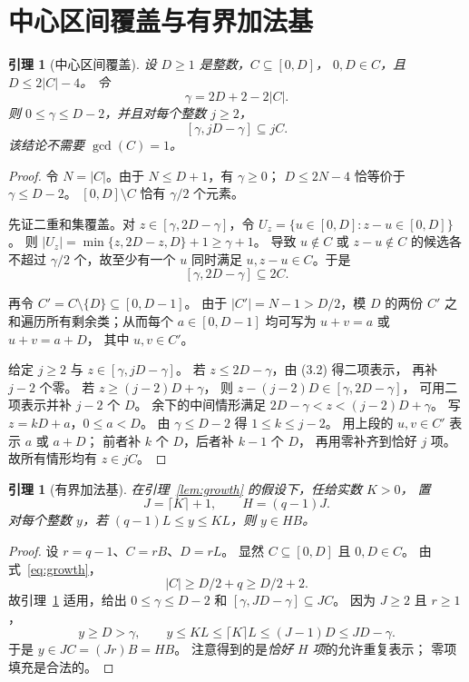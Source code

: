 \documentclass[UTF8,a4paper,11pt,fontset=none]{ctexart}
\newtheorem{lemma}[theorem]{引理}
\theoremstyle{remark}
\newcommand{\gcdop}{\operatorname{gcd}}
\begin{document}
\section{中心区间覆盖与有界加法基}
\begin{lemma}[中心区间覆盖]\label{lem:central}
设 $D\ge1$ 是整数，$C\subseteq[0,D]$，
$0,D\in C$，且 $D\le2|C|-4$。
令
\[
 \gamma=2D+2-2|C|.
\]
则 $0\le\gamma\le D-2$，并且对每个整数 $j\ge2$，
\[
  [\gamma,jD-\gamma]\subseteq jC. \tag{3.1}\label{eq:central}
\]
该结论不需要 $\gcdop(C)=1$。
\end{lemma}
\begin{proof}
令 $N=|C|$。由于 $N\le D+1$，有 $\gamma\ge0$；
$D\le2N-4$ 恰等价于 $\gamma\le D-2$。
$[0,D]\setminus C$ 恰有 $\gamma/2$ 个元素。

先证二重和集覆盖。对
$z\in[\gamma,2D-\gamma]$，令
$U_z=\{u\in[0,D]:z-u\in[0,D]\}$。
则 $|U_z|=\min\{z,2D-z,D\}+1\ge\gamma+1$。
导致 $u\notin C$ 或 $z-u\notin C$ 的候选各不超过
$\gamma/2$ 个，故至少有一个 $u$ 同时满足
$u,z-u\in C$。于是
\[
 [\gamma,2D-\gamma]\subseteq2C. \tag{3.2}
\]

再令 $C'=C\setminus\{D\}\subseteq[0,D-1]$。
由于 $|C'|=N-1>D/2$，模 $D$ 的两份 $C'$
之和遍历所有剩余类；从而每个 $a\in[0,D-1]$
均可写为 $u+v=a$ 或 $u+v=a+D$，
其中 $u,v\in C'$。

给定 $j\ge2$ 与 $z\in[\gamma,jD-\gamma]$。
若 $z\le2D-\gamma$，由 (3.2) 得二项表示，
再补 $j-2$ 个零。
若 $z\ge(j-2)D+\gamma$，
则 $z-(j-2)D\in[\gamma,2D-\gamma]$，
可用二项表示并补 $j-2$ 个 $D$。
余下的中间情形满足
$2D-\gamma<z<(j-2)D+\gamma$。
写 $z=kD+a$，$0\le a<D$。
由 $\gamma\le D-2$ 得 $1\le k\le j-2$。
用上段的 $u,v\in C'$ 表示 $a$ 或 $a+D$；
前者补 $k$ 个 $D$，后者补 $k-1$ 个 $D$，
再用零补齐到恰好 $j$ 项。
故所有情形均有 $z\in jC$。
\end{proof}

\begin{lemma}[有界加法基]\label{lem:basis}
在引理~\ref{lem:growth} 的假设下，任给实数 $K>0$，
置
\[
 J=\lceil K\rceil+1,\qquad H=(q-1)J.
\]
对每个整数 $y$，若
$(q-1)L\le y\le KL$，则 $y\in HB$。
\end{lemma}
\begin{proof}
设 $r=q-1$、$C=rB$、$D=rL$。
显然 $C\subseteq[0,D]$ 且 $0,D\in C$。
由式~\eqref{eq:growth}，
\[
 |C|\ge D/2+q\ge D/2+2.
\]
故引理~\ref{lem:central} 适用，给出
$0\le\gamma\le D-2$ 和
$[\gamma,JD-\gamma]\subseteq JC$。
因为 $J\ge2$ 且 $r\ge1$，
\[
 y\ge D>\gamma,\qquad
 y\le KL\le\lceil K\rceil L
     \le(J-1)D\le JD-\gamma.
\]
于是 $y\in JC=(Jr)B=HB$。
注意得到的是\emph{恰好 $H$ 项}的允许重复表示；
零项填充是合法的。
\end{proof}
\end{document}
